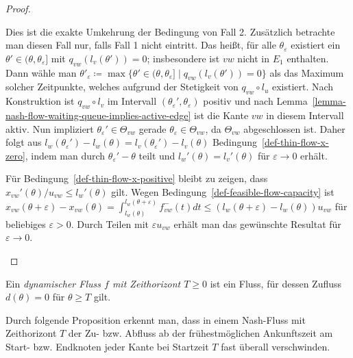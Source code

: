 \begin{proof}
\begin{description}[leftmargin=0cm, topsep=0cm, itemindent=0.5cm]
		Dies ist die exakte Umkehrung der Bedingung von Fall 2.
		Zusätzlich betrachte man diesen Fall nur, falls Fall 1 nicht eintritt.
		Das heißt, für alle $\theta_\varepsilon$ existiert ein $\theta'\in(\theta, \theta_\varepsilon]$ mit $q_{vw}(l_v(\theta')) = 0$; insbesondere ist $vw$ nicht in $E_1$ enthalten.
		Dann wähle man $\theta'_\varepsilon\coloneq \max\{ \theta'\in (\theta, \theta_\varepsilon] \mid q_{vw}(l_v(\theta')) = 0 \}$ als das Maximum solcher Zeitpunkte, welches aufgrund der Stetigkeit von $q_{vw}\circ l_u$ existiert.
		Nach Konstruktion ist $q_{vw}\circ l_v$ im Intervall $(\theta_\varepsilon', \theta_\varepsilon)$ positiv und nach Lemma~\ref{lemma-nash-flow-waiting-queue-implies-active-edge} ist die Kante $vw$ in diesem Intervall aktiv.
		Nun impliziert $\theta_\varepsilon'\in \Theta_{vw}$ gerade $\theta_\varepsilon\in\Theta_{vw}$, da $\Theta_{vw}$ ab\-ge\-schlossen ist.
		Daher folgt aus $l_w(\theta_\varepsilon') - l_w(\theta) = l_v(\theta_\varepsilon') - l_v(\theta)$ 		Bedingung~\ref{def-thin-flow-x-zero}, indem man durch $\theta_\varepsilon'-\theta$ teilt und $l_w'(\theta) = l_v'(\theta)$ für $\varepsilon\rightarrow0$ erhält.
		
		Für Bedingung~\ref{def-thin-flow-x-positive} bleibt zu zeigen, dass $x_{vw}'(\theta) /u_{vw}\leq l_w'(\theta)$ gilt.
		Wegen Bedingung~\ref{def-feasible-flow-capacity} ist $x_{vw}(\theta + \varepsilon)-x_{vw}(\theta) = \int_{l_w(\theta)}^{l_w(\theta+\varepsilon)} f_{vw}^-(t) dt\leq (l_w(\theta + \varepsilon) - l_w(\theta)) u_{vw}$ für beliebiges $\varepsilon>0$.
		Durch Teilen mit $\varepsilon u_{vw}$ erhält man das gewünschte Resultat für $\varepsilon\rightarrow 0$.
	\end{description}\vspace{-1.4em}
\end{proof}

\begin{definition}
	Ein \emph{dynamischer Fluss $f$ mit Zeithorizont $T\geq0$} ist ein Fluss, für dessen Zufluss $d(\theta)= 0$ für $\theta\geq T$ gilt.
\end{definition}

Durch folgende Proposition erkennt man, dass in einem Nash-Fluss mit Zeithorizont $T$ der Zu- bzw. Abfluss ab der frühestmöglichen Ankunftszeit am Start- bzw. Endknoten jeder Kante bei Startzeit $T$ fast überall verschwinden.

